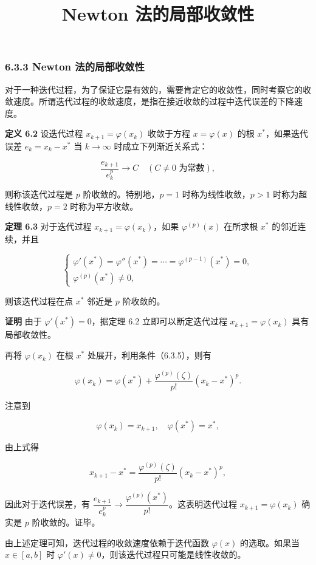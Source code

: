 \documentclass[
  10pt,
  fontset=fandol]{ctexart}
\title{Newton 法的局部收敛性}
\author{}
\date{}
\begin{document}
\maketitle

\subsubsection{6.3.3 Newton 法的局部收敛性}\label{newton-ux6cd5ux7684ux5c40ux90e8ux6536ux655bux6027}

对于一种迭代过程，为了保证它是有效的，需要肯定它的收敛性，同时考察它的收敛速度。所谓迭代过程的收敛速度，是指在接近收敛的过程中迭代误差的下降速度。

\textbf{定义 6.2} 设迭代过程 \(x_{k+1}=\varphi(x_k)\) 收敛于方程 \(x=\varphi(x)\) 的根 \(x^*\)，如果迭代误差 \(e_k=x_k-x^*\) 当 \(k\to\infty\) 时成立下列渐近关系式：

\[
\frac{e_{k+1}}{e_k^p}\to C\quad(C\ne0\text{ 为常数}),
\]

则称该迭代过程是 \(p\) 阶收敛的。特别地，\(p=1\) 时称为线性收敛，\(p>1\) 时称为超线性收敛，\(p=2\) 时称为平方收敛。

\textbf{定理 6.3} 对于迭代过程 \(x_{k+1}=\varphi(x_k)\)，如果 \(\varphi^{(p)}(x)\) 在所求根 \(x^*\) 的邻近连续，并且

\[
\begin{cases}
\varphi'(x^*)=\varphi''(x^*)=\cdots=\varphi^{(p-1)}(x^*)=0,\\
\varphi^{(p)}(x^*)\ne0,
\end{cases}
\tag{6.3.5}
\]

则该迭代过程在点 \(x^*\) 邻近是 \(p\) 阶收敛的。

\textbf{证明} 由于 \(\varphi'(x^*)=0\)，据定理 6.2 立即可以断定迭代过程 \(x_{k+1}=\varphi(x_k)\) 具有局部收敛性。

再将 \(\varphi(x_k)\) 在根 \(x^*\) 处展开，利用条件（6.3.5），则有

\[
\varphi(x_k)=\varphi(x^*)+\frac{\varphi^{(p)}(\zeta)}{p!}(x_k-x^*)^p.
\]

注意到

\[
\varphi(x_k)=x_{k+1},\quad\varphi(x^*)=x^*,
\]

由上式得

\[
x_{k+1}-x^*=\frac{\varphi^{(p)}(\zeta)}{p!}(x_k-x^*)^p,
\]

因此对于迭代误差，有 \(\dfrac{e_{k+1}}{e_k^p}\to\dfrac{\varphi^{(p)}(x^*)}{p!}\)。这表明迭代过程 \(x_{k+1}=\varphi(x_k)\) 确实是 \(p\) 阶收敛的。证毕。

由上述定理可知，迭代过程的收敛速度依赖于迭代函数 \(\varphi(x)\) 的选取。如果当 \(x\in[a,b]\) 时 \(\varphi'(x)\ne0\)，则该迭代过程只可能是线性收敛的。
\end{document}
